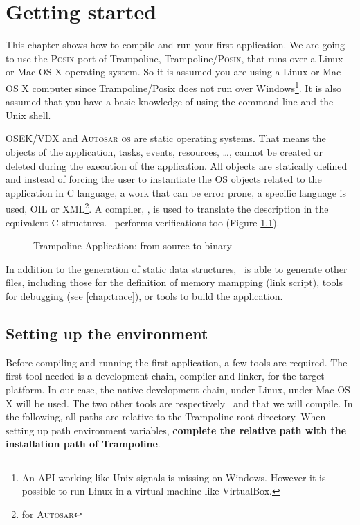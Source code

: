 
\chapter{Getting started}

This chapter shows how to compile and run your first application. We are going to use the \textsc{Posix} port of Trampoline, Trampoline/\textsc{Posix}, that runs over a Linux or Mac OS X operating system. So it is assumed you are using a Linux or Mac OS X computer since Trampoline/Posix does not run over Windows\footnote{An API working like Unix signals is missing on Windows. However it is possible to run Linux in a virtual machine like VirtualBox.}. It is also assumed that you have a basic knowledge of using the command line and the Unix shell.

OSEK/VDX and \textsc{Autosar os} are static operating systems. That means the objects of the application, tasks, events, resources, \ldots, cannot be created or deleted during the execution of the application. All objects are statically defined and instead of forcing the user to instantiate the OS objects related to the application in C language, a work that can be error prone, a specific language is used, OIL or XML\footnote{for \textsc{Autosar}}. A compiler, \goil, is used to translate the description in the equivalent C structures. \goil\ performs verifications too (Figure \ref{fig:files}).

\begin{figure}[htbp]
  \centering
\begin{adjustbox}{width=.7\linewidth,keepaspectratio}
  
\end{adjustbox}
\caption{Trampoline Application: from source to binary}
\label{fig:files}
\end{figure}

In addition to the generation of static data structures, \goil\ is able to generate other files, including those for the definition of memory mampping (link script), tools for debugging (see \ref{chap:trace}), or tools to build the application.

\section{Setting up the environment}

Before compiling and running the first application, a few tools are required. The first tool needed is a development chain, compiler and linker, for the target platform. In our case, the native development chain,  under Linux,  under Mac OS X will be used. The two other tools are respectively \goil\ and  that we will compile. In the following, all paths are relative to the Trampoline root directory. When setting up path environment variables, \textbf{complete the relative path with the installation path of Trampoline}.

